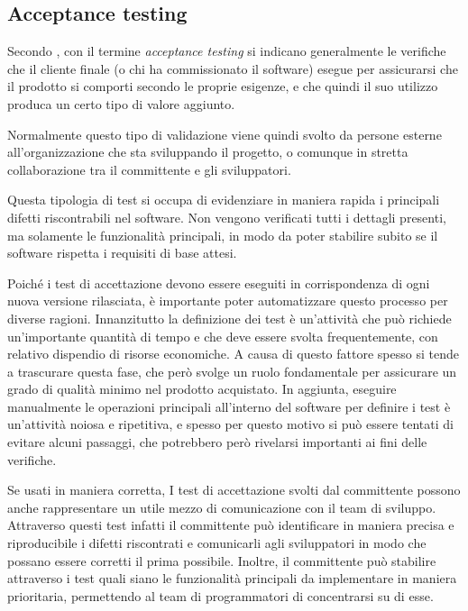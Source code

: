 \subsection{Acceptance testing}

Secondo \cite{KanerFalk}, con il termine \emph{acceptance testing} si indicano generalmente le verifiche che il cliente finale (o chi ha commissionato il software) esegue per assicurarsi che il prodotto si comporti secondo le proprie esigenze, e che quindi il suo utilizzo produca un certo tipo di valore aggiunto.

Normalmente questo tipo di validazione viene quindi svolto da persone esterne all'organizzazione che sta sviluppando il progetto, o comunque in stretta collaborazione tra il committente e gli sviluppatori. 

Questa tipologia di test si occupa di evidenziare in maniera rapida i principali difetti riscontrabili nel software. Non vengono verificati tutti i dettagli presenti, ma solamente le funzionalità principali, in modo da poter stabilire subito se il software rispetta i requisiti di base attesi.

Poiché i test di accettazione devono essere eseguiti in corrispondenza di ogni nuova versione rilasciata, è importante poter automatizzare questo processo per diverse ragioni. Innanzitutto la definizione dei test è un'attività che può richiede un'importante quantità di tempo e che deve essere svolta frequentemente, con relativo dispendio di risorse economiche. A causa di questo fattore spesso si tende a trascurare questa fase, che però svolge un ruolo fondamentale per assicurare un grado di qualità minimo nel prodotto acquistato. In aggiunta, eseguire manualmente le operazioni principali all'interno del software per definire i test è un'attività noiosa e ripetitiva, e spesso per questo motivo si può essere tentati di evitare alcuni passaggi, che potrebbero però rivelarsi importanti ai fini delle verifiche.

Se usati in maniera corretta, I test di accettazione svolti dal committente possono anche rappresentare un utile mezzo di comunicazione con il team di sviluppo. Attraverso questi test infatti il committente può identificare in maniera precisa e riproducibile i difetti riscontrati e comunicarli agli sviluppatori in modo che possano essere corretti il prima possibile. Inoltre, il committente può stabilire attraverso i test quali siano le funzionalità principali da implementare in maniera prioritaria, permettendo al team di programmatori di concentrarsi su di esse.

